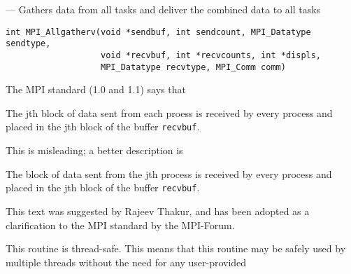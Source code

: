 \startmanpage
{}
--- Gathers data from all tasks and deliver the combined data to all tasks 
\startvb\begin{verbatim}
int MPI_Allgatherv(void *sendbuf, int sendcount, MPI_Datatype sendtype, 
                   void *recvbuf, int *recvcounts, int *displs, 
                   MPI_Datatype recvtype, MPI_Comm comm)

\end{verbatim}
\endvb

\par
{}
\par
{}
The MPI standard (1.0 and 1.1) says that
\nextline
\par
\nextline
\par
The jth block of data sent from
each proess is received by every process and placed in the jth block of the
buffer {\tt recvbuf}.
\nextline
\par
\nextline
\par
This is misleading; a better description is
\nextline
\par
\nextline
\par
The block of data sent from the jth process is received by every
process and placed in the jth block of the buffer {\tt recvbuf}.
\nextline
\par
\nextline
\par
This text was suggested by Rajeev Thakur, and has been adopted as a
clarification to the MPI standard by the MPI-Forum.
\par
{}
\par
This routine is thread-safe.  This means that this routine may be
safely used by multiple threads without the need for any user-provided
